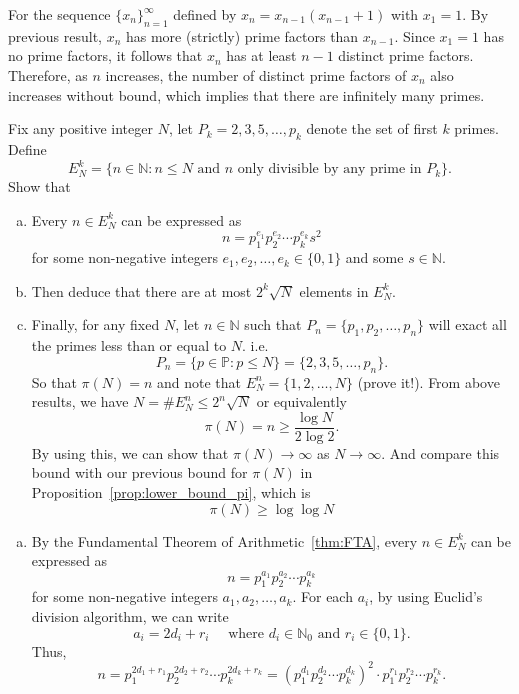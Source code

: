 \documentclass{elegantbook}
\begin{document}
\begin{problemset}[Exercises]
\begin{solution}
    For the sequence $\{x_n\}_{n=1}^{\infty}$ defined by $x_{n} = x_{n-1}(x_{n-1}+1)$ with $x_1 = 1$. By previous result, $x_n$ has more (strictly) prime factors than $x_{n-1}$. Since $x_1 = 1$ has no prime factors, it follows that $x_n$ has at least $n-1$ distinct prime factors. Therefore, as $n$ increases, the number of distinct prime factors of $x_n$ also increases without bound, which implies that there are infinitely many primes.
  \end{solution}  
  \item Fix any positive integer $N$, let $P_k={2, 3, 5, \ldots, p_k}$ denote the set of first $k$ primes. Define
  \[
    E^k_N = \{n \in \mathbb{N}: n\leq N \text{ and $n$ only divisible by any prime in } P_k\}.
  \]
  Show that
  \begin{enumerate}[(a)]
    \item Every $n \in E^k_N$ can be expressed as
    \[
      n = p_1^{e_1} p_2^{e_2} \cdots p_k^{e_k} s^2
    \]
    for some non-negative integers $e_1, e_2, \ldots, e_k \in \{0, 1\}$ and some $s \in \mathbb{N}$.
    \item Then deduce that there are at most $2^k \sqrt{N}$ elements in $E^k_N$.
    \item Finally, for any fixed $N$, let $n\in\mathbb{N}$ such that $P_n=\{p_1, p_2, \ldots, p_n\}$ will exact all the primes less than or equal to $N$. i.e.
    \[
      P_n = \{p \in \mathbb{P}: p \leq N\}= \{2, 3, 5, \ldots, p_n\}.
    \]
    So that $\pi(N)=n$ and note that $E^n_N=\{1, 2, \ldots, N\}$ (prove it!). From above results, we have $N=\#E^n_N \leq 2^n \sqrt{N}$ or equivalently
    \[
      \pi(N)=n \geq \frac{\log N}{2 \log 2}.
    \]
    By using this, we can show that $\pi(N)\to\infty$ as $N \to \infty$. And compare this bound with our previous bound for $\pi(N)$ in Proposition~\ref{prop:lower_bound_pi}, which is
    \[
      \pi(N) \geq \log \log N
    \]
  \end{enumerate}
  \begin{solution}
    \begin{enumerate}[(a)]
      \item By the Fundamental Theorem of Arithmetic~\ref{thm:FTA}, every $n \in E^k_N$ can be expressed as
      \[
        n = p_1^{a_1} p_2^{a_2} \cdots p_k^{a_k}
      \]
      for some non-negative integers $a_1, a_2, \ldots, a_k$. For each $a_i$, by using Euclid's division algorithm, we can write
      \[
        a_i = 2d_i + r_i \quad \text{ where } d_i \in \mathbb{N}_0 \text{ and } r_i \in \{0, 1\}.
      \]
      Thus,
      \[
        n = p_1^{2d_1 + r_1} p_2^{2d_2 + r_2} \cdots p_k^{2d_k + r_k} = (p_1^{d_1} p_2^{d_2} \cdots p_k^{d_k})^2 \cdot p_1^{r_1} p_2^{r_2} \cdots p_k^{r_k}.
\]
\end{enumerate}
\end{solution}
\end{problemset}
\end{document}
